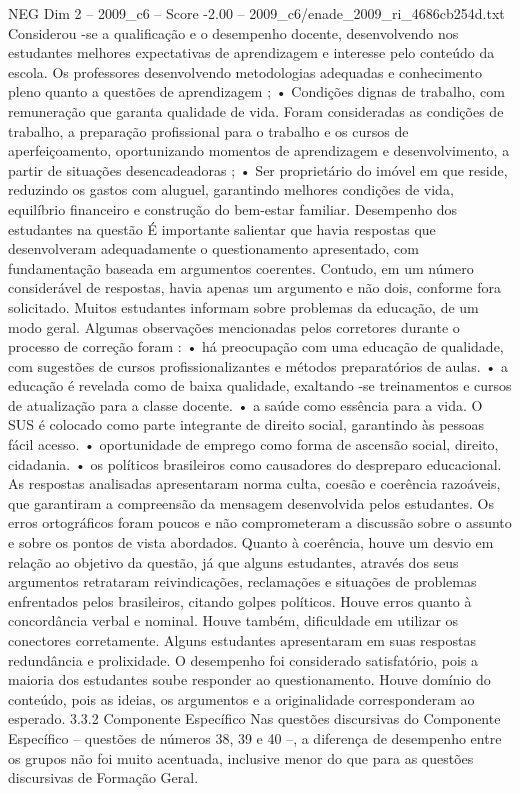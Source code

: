 \begin{textsample}{NEG Dim 2 – 2009\_c6 – Score -2.00 – 2009\_c6/enade\_2009\_ri\_4686cb254d.txt}
Considerou -se a qualificação e o desempenho docente, desenvolvendo nos estudantes melhores expectativas de aprendizagem e interesse pelo conteúdo da escola.
Os professores desenvolvendo metodologias adequadas e conhecimento pleno quanto a questões de aprendizagem ; • Condições dignas de trabalho, com remuneração que garanta qualidade de vida.
Foram consideradas as condições de trabalho, a preparação profissional para o trabalho e os cursos de aperfeiçoamento, oportunizando momentos de aprendizagem e desenvolvimento, a partir de situações desencadeadoras ; • Ser proprietário do imóvel em que reside, reduzindo os gastos com aluguel, garantindo melhores condições de vida, equilíbrio financeiro e construção do bem-estar familiar.
Desempenho dos estudantes na questão É importante salientar que havia respostas que desenvolveram adequadamente o questionamento apresentado, com fundamentação baseada em argumentos coerentes.
Contudo, em um número considerável de respostas, havia apenas um argumento e não dois, conforme fora solicitado.
Muitos estudantes informam sobre problemas da educação, de um modo geral.
Algumas observações mencionadas pelos corretores durante o processo de correção foram : • há preocupação com uma educação de qualidade, com sugestões de cursos profissionalizantes e métodos preparatórios de aulas. • a educação é revelada como de baixa qualidade, exaltando -se treinamentos e cursos de atualização para a classe docente. • a saúde como essência para a vida.
O SUS é colocado como parte integrante de direito social, garantindo às pessoas fácil acesso. • oportunidade de emprego como forma de ascensão social, direito, cidadania. • os políticos brasileiros como causadores do despreparo educacional.
As respostas analisadas apresentaram norma culta, coesão e coerência razoáveis, que garantiram a compreensão da mensagem desenvolvida pelos estudantes.
Os erros ortográficos foram poucos e não comprometeram a discussão sobre o assunto e sobre os pontos de vista abordados.
Quanto à coerência, houve um desvio em relação ao objetivo da questão, já que alguns estudantes, através dos seus argumentos retrataram reivindicações, reclamações e situações de problemas enfrentados pelos brasileiros, citando golpes políticos.
Houve erros quanto à concordância verbal e nominal.
Houve também, dificuldade em utilizar os conectores corretamente.
Alguns estudantes apresentaram em suas respostas redundância e prolixidade.
O desempenho foi considerado satisfatório, pois a maioria dos estudantes soube responder ao questionamento.
Houve domínio do conteúdo, pois as ideias, os argumentos e a originalidade corresponderam ao esperado. 3.3.2 Componente Específico Nas questões discursivas do Componente Específico – questões de números 38, 39 e 40 –, a diferença de desempenho entre os grupos não foi muito acentuada, inclusive menor do que para as questões discursivas de Formação Geral.

\end{textsample}

